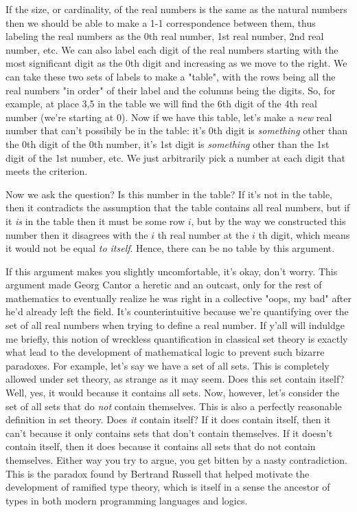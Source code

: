 \documentclass[11pt]{article}
\begin{document}
If the size, or cardinality, of the real numbers is the same as the natural numbers then we should be able to make a 1-1 correspondence between them, thus labeling the real numbers as the 0th real number,  1st real number, 2nd real number, etc. We can also label each digit of the real numbers starting with the most significant digit as the 0th digit and increasing as we move to the right. We can take these two sets of labels to make a "table", with the rows being all the real numbers "in order" of their label and the columns being the digits. So, for example, at place 3,5 in the table we will find the 6th digit of the 4th real number (we're starting at 0). Now if we have this table, let's make a \emph{new} real number that can't possibily be in the table: it's 0th digit is \emph{something} other than the 0th digit of the 0th number, it's 1st digit is \emph{something} other than the 1st digit of the 1st number, etc. We just arbitrarily pick a number at each digit that meets the criterion. 

Now we ask the question? Is this number in the table? If it's not in the table, then it contradicts the assumption that the table contains all real numbers, but if it \emph{is} in the table then it must be some row $i$, but by the way we constructed this number then it disagrees with the $i$ th real number at the $i$ th digit, which means it would not be equal \emph{to itself}. Hence, there can be no table by this argument. 

If this argument makes you slightly uncomfortable, it's okay, don't worry. This argument made Georg Cantor a heretic and an outcast, only for the rest of mathematics to eventually realize he was right in a collective "oops, my bad" after he'd already left the field. It's counterintuitive because we're quantifying over the set of all real numbers when trying to define a real number. If y'all will induldge me briefly, this notion of wreckless quantification in classical set theory is exactly what lead to the development of mathematical logic to prevent such bizarre paradoxes. For example, let's say we have a set of all sets. This is completely allowed under set theory, as strange as it may seem. Does this set contain itself? Well, yes, it would because it contains all sets. Now, however, let's consider the set of all sets that do \emph{not} contain themselves. This is also a perfectly reasonable definition in set theory. Does \emph{it} contain itself? If it does contain itself, then it can't because it only contains sets that don't contain themselves. If it doesn't contain itself, then it does because it contains all sets that do not contain themselves. Either way you try to argue, you get bitten by a nasty contradiction. This is the paradox found by Bertrand Russell that helped motivate the development of ramified type theory, which is itself in a sense the ancestor of types in both modern programming languages and logics. 
\end{document}
